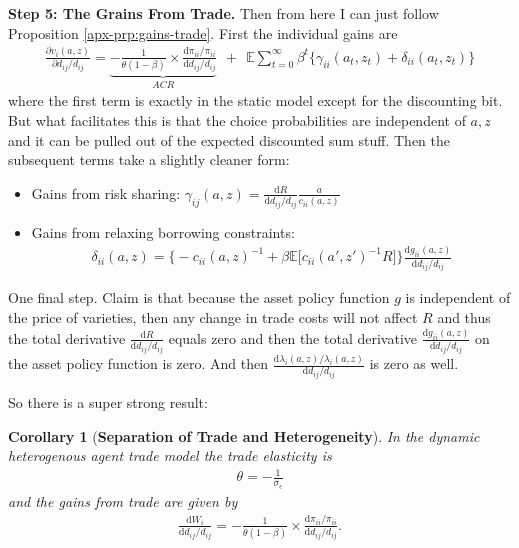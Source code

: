 \documentclass[12pt,pdftex]{article}
\newtheorem{corr}{Corollary}
\begin{document}
\begin{onehalfspacing}
\textbf{Step 5: The Grains From Trade.} Then from here I can just follow Proposition \ref{apx-prp:gains-trade}. First the individual gains are
{\footnotesize
\begin{align}
\nonumber
\frac{\partial v_i(a, z)}{\partial d_{ij} / d_{ij}} = \underbrace{-\frac{1}{\theta (1-\beta)} \times \frac{\mathrm{d} \pi_{ii} / \pi_{ii}}{\mathrm{d}d_{ij} / d_{ij}}}_{ACR} \ \ + \ \
\mathbb{E} \sum_{t = 0}^{\infty} \beta^{t} \bigg \{ \gamma_{ii}(a_{t},z_{t}) + \delta_{ii}(a_{t},z_{t}) \bigg \}
\end{align}
}where the first term is exactly in the static model except for the discounting bit. But what facilitates this is that the choice probabilities are independent of $a,z$ and it can be pulled out of the expected discounted sum stuff. Then the subsequent terms take a slightly cleaner form:
\begin{itemize}
\item Gains from risk sharing: $\gamma_{ij}(a,z) = \frac{\mathrm{d} R}{\mathrm{d} d_{ij} / d_{ij}}\frac{a}{c_{ii}(a,z)}$
\item Gains from relaxing borrowing constraints:
\begin{align}
\nonumber
\delta_{ii}(a,z) = \bigg \{- c_{ii}(a,z)^{-1} + \beta \mathbb{E} \big [ c_{ii}(a',z')^{-1}R \big ] \bigg \}\frac{\mathrm{d} g_{ii}(a,z)}{\mathrm{d} d_{ij} / d_{ij}}
\end{align}
\end{itemize}
One final step. Claim is that because the asset policy function $g$ is independent of the price of varieties, then any change in trade costs will not affect $R$ and thus the total derivative $\frac{\mathrm{d} R}{\mathrm{d} d_{ij} / d_{ij}}$ equals zero and then the total derivative $\frac{\mathrm{d} g_{ii}(a,z)}{\mathrm{d} d_{ij} / d_{ij}}$ on the asset policy function is zero. And then $\frac{\mathrm{d} \lambda_{i}(a,z)/ \lambda_{i}(a,z)}{\mathrm{d} d_{ij} / d_{ij}}$ is zero as well.

So there is a super strong result:
\begin{corr}[\textbf{Separation of Trade and Heterogeneity}] In the dynamic heterogenous agent trade model the trade elasticity is
\begin{align}
\theta = -\frac{1}{\sigma_{\epsilon}} \nonumber
\end{align}
and the gains from trade are given by
\begin{align}
\frac{\mathrm{d} W_{i}}{\mathrm{d} d_{ij} / d_{ij}} = -\frac{1}{\theta (1-\beta)} \times \frac{\mathrm{d} \pi_{ii} / \pi_{ii}}{\mathrm{d}d_{ij} / d_{ij}}.
\end{align}
\end{corr}



\end{onehalfspacing}
\end{document}
